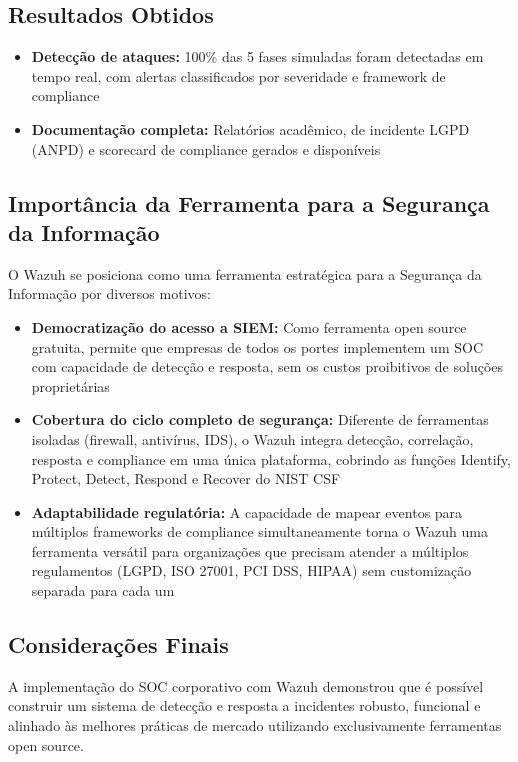 \documentclass[12pt,a4paper]{article}
\begin{document}
    \subsection{Resultados Obtidos}

    \begin{itemize}
        \item \textbf{Detecção de ataques:} 100\% das 5 fases simuladas foram detectadas em tempo real, com alertas classificados por severidade e framework de compliance
        \item \textbf{Documentação completa:} Relatórios acadêmico, de incidente LGPD (ANPD) e scorecard de compliance gerados e disponíveis
    \end{itemize}

    \subsection{Importância da Ferramenta para a Segurança da Informação}

    O Wazuh se posiciona como uma ferramenta estratégica para a Segurança da Informação por diversos motivos:

    \begin{itemize}
        \item \textbf{Democratização do acesso a SIEM:} Como ferramenta open source gratuita, permite que empresas de todos os portes implementem um SOC com capacidade de detecção e resposta, sem os custos proibitivos de soluções proprietárias
        \item \textbf{Cobertura do ciclo completo de segurança:} Diferente de ferramentas isoladas (firewall, antivírus, IDS), o Wazuh integra detecção, correlação, resposta e compliance em uma única plataforma, cobrindo as funções Identify, Protect, Detect, Respond e Recover do NIST CSF
        \item \textbf{Adaptabilidade regulatória:} A capacidade de mapear eventos para múltiplos frameworks de compliance simultaneamente torna o Wazuh uma ferramenta versátil para organizações que precisam atender a múltiplos regulamentos (LGPD, ISO 27001, PCI DSS, HIPAA) sem customização separada para cada um
    \end{itemize}

    \subsection{Considerações Finais}

    A implementação do SOC corporativo com Wazuh demonstrou que é possível construir um sistema de detecção e resposta a incidentes robusto, funcional e alinhado às melhores práticas de mercado utilizando exclusivamente ferramentas open source.
\end{document}
